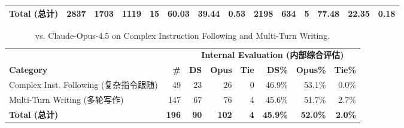 \begin{table}[t]
\begin{tabular}{l r | rrr rrr | rrr rrr}
\midrule
\textbf{Total (总计)} & \textbf{2837} & \textbf{1703} & \textbf{1119} & \textbf{15} & \textbf{60.03} & \textbf{39.44} & \textbf{0.53} & \textbf{2198} & \textbf{634} & \textbf{5} & \textbf{77.48} & \textbf{22.35} & \textbf{0.18} \\

\bottomrule
\end{tabular}
\end{table}

\begin{table}[htbp]
\centering
\caption{\dsvivp{} vs. Claude-Opus-4.5 on Complex Instruction Following and Multi-Turn Writing.}
\label{tab:complex_multiturn}
\small
\setlength{\tabcolsep}{4pt}
\begin{tabular}{l r | rrr rrr}
\toprule
& & \multicolumn{6}{c}{\textbf{Internal Evaluation (内部综合评估)}} \\
\cmidrule(lr){3-8}
\textbf{Category} & \textbf{\#}
  & \textbf{DS} & \textbf{Opus} & \textbf{Tie}
  & \textbf{DS\%} & \textbf{Opus\%} & \textbf{Tie\%} \\
\midrule

Complex Inst. Following (复杂指令跟随) & 49 & 23 & 26 & 0 & 46.9\% & 53.1\% & 0.0\% \\
Multi-Turn Writing (多轮写作) & 147 & 67 & 76 & 4 & 45.6\% & 51.7\% & 2.7\% \\

\midrule

\textbf{Total (总计)} & \textbf{196} & \textbf{90} & \textbf{102} & \textbf{4} & \textbf{45.9\%} & \textbf{52.0\%} & \textbf{2.0\%} \\

\bottomrule
\end{tabular}
\end{table}